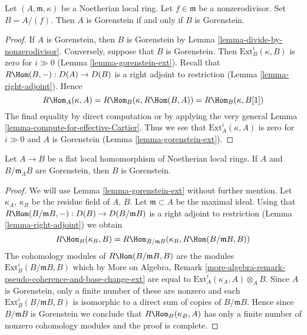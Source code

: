 \begin{lemma}
\label{lemma-gorenstein-divide-by-nonzerodivisor}
Let $(A, \mathfrak m, \kappa)$
be a Noetherian local ring. Let $f \in \mathfrak m$ be a
nonzerodivisor. Set $B = A/(f)$. Then $A$ is Gorenstein if and
only if $B$ is Gorenstein.
\end{lemma}

\begin{proof}
If $A$ is Gorenstein, then $B$ is Gorenstein by
Lemma \ref{lemma-divide-by-nonzerodivisor}.
Conversely, suppose that $B$ is Gorenstein. Then
$\text{Ext}^i_B(\kappa, B)$ is zero for $i \gg 0$
(Lemma \ref{lemma-gorenstein-ext}).
Recall that $R\Hom(B, -) : D(A) \to D(B)$ is a right adjoint
to restriction (Lemma \ref{lemma-right-adjoint}).
Hence
$$
R\Hom_A(\kappa, A) = R\Hom_B(\kappa, R\Hom(B, A)) =
R\Hom_B(\kappa, B[1])
$$
The final equality by direct computation or by applying the
very general Lemma \ref{lemma-compute-for-effective-Cartier}.
Thus we see that $\text{Ext}^i_A(\kappa, A)$ is zero for
$i \gg 0$ and $A$ is Gorenstein (Lemma \ref{lemma-gorenstein-ext}).
\end{proof}

\begin{lemma}
\label{lemma-flat-over-gorenstein-gorenstein-fibre}
Let $A \to B$ be a flat local homomorphism of Noetherian local rings.
If $A$ and $B/\mathfrak m_A B$ are Gorenstein, then $B$ is Gorenstein.
\end{lemma}

\begin{proof}
We will use Lemma \ref{lemma-gorenstein-ext} without further mention.
Let $\kappa_A$, $\kappa_B$ be the residue field of $A$, $B$.
Let $\mathfrak m \subset A$ be the maximal ideal. Using that
$R\Hom(B/\mathfrak m B, -) : D(B) \to D(B/\mathfrak m B)$ is a right adjoint
to restriction (Lemma \ref{lemma-right-adjoint}) we obtain
$$
R\Hom_B(\kappa_B, B) =
R\Hom_{B/\mathfrak m B}(\kappa_B, R\Hom(B/\mathfrak m B, B))
$$
The cohomology modules of $R\Hom(B/\mathfrak m B, B)$ are the
modules $\text{Ext}^i_B(B/\mathfrak mB, B)$ which by
More on Algebra, Remark
\ref{more-algebra-remark-pseudo-coherence-and-base-change-ext}
are equal to $\text{Ext}^i_A(\kappa_A, A) \otimes_A B$.
Since $A$ is Gorenstein, only a finite number of these are
nonzero and each $\text{Ext}^i_B(B/\mathfrak mB, B)$ is
isomorphic to a direct sum of copies of $B/\mathfrak m B$.
Hence since $B/\mathfrak mB$ is Gorenstein we conclude that
$R\Hom_B(\kappa_B, A)$ has only a finite number of nonzero
cohomology modules and the proof is complete.
\end{proof}

